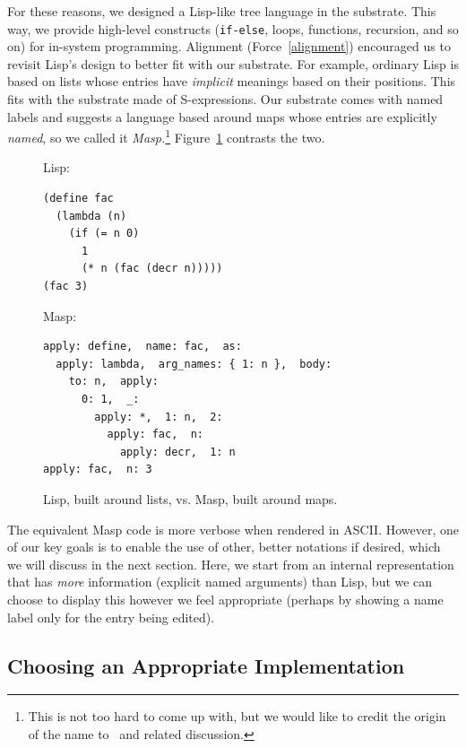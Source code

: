 \documentclass[ twoside,openright,titlepage,numbers=noenddot,headinclude,footinclude,cleardoublepage=empty,abstract=on,
                BCOR=5mm,paper=a4,fontsize=11pt
                ]{scrreprt}
\newcommand{\tomas}[1]{}
\theoremstyle{definition}
\begin{document}
For these reasons, we designed a Lisp-like tree language in the
substrate. This way, we provide high-level constructs (\texttt{if-else},
loops, functions, recursion, and so on) for in-system programming.
Alignment (Force~\ref{alignment}) encouraged us to revisit Lisp's design
to better fit with our substrate. For example, ordinary Lisp is based on
lists whose entries have \emph{implicit} meanings based on their
positions. This fits with the substrate made of S-expressions. Our
substrate comes with named labels and suggests a language based around
maps whose entries are explicitly \emph{named}, so we called it
\emph{Masp.}\footnote{This is not too hard to come up with, but we would
  like to credit the origin of the name to~\parencite{Masp} and related
  discussion.} Figure~\ref{fig:lisp} contrasts the two.

\tomas{Maybe use more verbose JSON like syntax, because figuring out the nesting rules below is not obvious. (Plus you need to have curly brackets if you want your language to take over the world, right??)}

\begin{figure}
\raggedright
Lisp:
\begin{verbatim}
(define fac
  (lambda (n)
    (if (= n 0)
      1
      (* n (fac (decr n)))))
(fac 3)
\end{verbatim}
Masp:
\begin{verbatim}
apply: define,  name: fac,  as:
  apply: lambda,  arg_names: { 1: n },  body:
    to: n,  apply:
      0: 1,  _:
        apply: *,  1: n,  2:
          apply: fac,  n:
            apply: decr,  1: n
apply: fac,  n: 3
\end{verbatim}
\caption[Lisp vs. Masp]{Lisp, built around lists, vs. Masp, built around maps.}
\label{fig:lisp}
\end{figure}

The equivalent Masp code is more verbose when rendered in ASCII.
However, one of our key goals is to enable the use of other, better
notations if desired, which we will discuss in the next section. Here,
we start from an internal representation that has \emph{more}
information (explicit named arguments) than Lisp, but we can choose to
display this however we feel appropriate (perhaps by showing a name
label only for the entry being edited).

\hypertarget{choosing-an-appropriate-implementation}{\subsection{Choosing an Appropriate
Implementation}\label{choosing-an-appropriate-implementation}}
\end{document}
